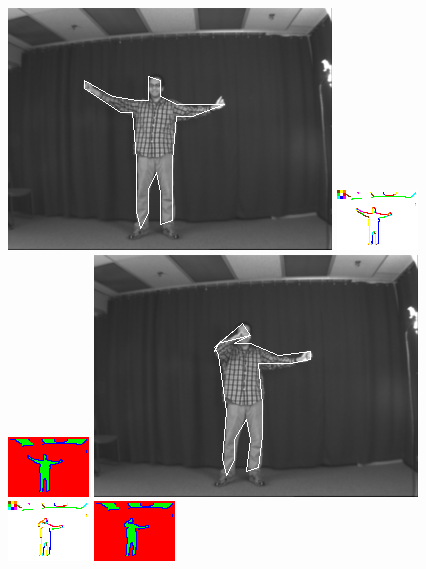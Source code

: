 \documentclass{tufte-book}
\begin{document}
\begin{figure}
\includegraphics[width=0.3 \linewidth]{output/2.detection/image_parsing/out.12.d/thefinalparse.png}
\includegraphics[width=0.3 \linewidth]{output/2.detection/image_parsing/out.12.d/local.x5.orientations.png}
\includegraphics[width=0.3 \linewidth]{output/2.detection/image_parsing/out.12.d/local.x5.interior.png}
\includegraphics[width=0.3 \linewidth]{output/2.detection/image_parsing/out.13.d/thefinalparse.png}
\includegraphics[width=0.3 \linewidth]{output/2.detection/image_parsing/out.13.d/local.x5.orientations.png}
\includegraphics[width=0.3 \linewidth]{output/2.detection/image_parsing/out.13.d/local.x5.interior.png}
\end{figure}
\end{document}

